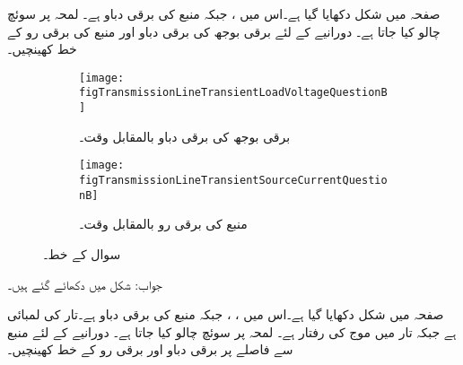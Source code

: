 صفحہ  میں شکل  دکھایا گیا ہے۔اس میں ،
  جبکہ منبع کی برقی دباو  ہے۔ لمحہ  پر سوئچ چالو کیا جاتا ہے۔ دورانیے کے لئے برقی بوجھ کی برقی دباو اور  منبع کی برقی رو کے خط کھینچیں۔

\begin{figure}
\centering
\begin{subfigure}{0.9\textwidth}
\centering
\texttt{[image: figTransmissionLineTransientLoadVoltageQuestionB]}
\caption{ برقی بوجھ کی برقی دباو بالمقابل وقت۔}
\label{شکل_ترسیلی_جواب_سوال_ب}
\end{subfigure}%

\begin{subfigure}{0.9\textwidth}
\centering
\texttt{[image: figTransmissionLineTransientSourceCurrentQuestionB]}
\caption{منبع کی برقی رو بالمقابل وقت۔}
\label{شکل_ترسیلی_جواب_منبع_رو_سوال_ب}
\end{subfigure}%
\caption{سوال  کے خط۔}
\label{شکل_سوال_ترسیلی_سوال_ب}
\end{figure}
جواب: شکل   میں دکھائے گئے ہیں۔


صفحہ  میں شکل  دکھایا گیا ہے۔اس میں ،
 ،   جبکہ منبع کی برقی دباو  ہے۔تار کی لمبائی  ہے جبکہ تار میں موج کی رفتار  ہے۔ لمحہ  پر سوئچ چالو کیا جاتا ہے۔ دورانیے کے لئے منبع سے  فاصلے پر  برقی دباو اور برقی رو کے خط کھینچیں۔


